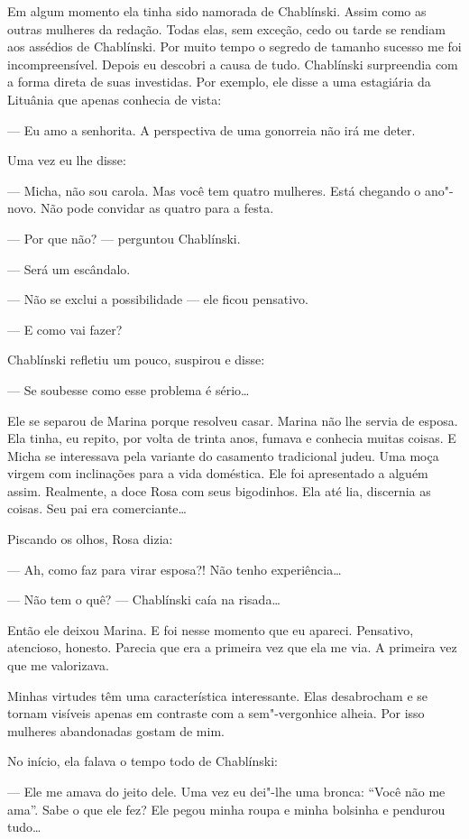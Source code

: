 Em algum momento ela tinha sido namorada de Chablínski. Assim como as
outras mulheres da redação. Todas elas, sem exceção, cedo ou tarde se
rendiam aos assédios de Chablínski. Por muito tempo o segredo de tamanho
sucesso me foi incompreensível. Depois eu descobri a causa de tudo.
Chablínski surpreendia com a forma direta de suas investidas. Por
exemplo, ele disse a uma estagiária da Lituânia que apenas conhecia de
vista:

--- Eu amo a senhorita. A perspectiva de uma gonorreia não irá me deter.

Uma vez eu lhe disse:

--- Micha, não sou carola. Mas você tem quatro mulheres. Está chegando o
ano"-novo. Não pode convidar as quatro para a festa.

--- Por que não? --- perguntou Chablínski.

--- Será um escândalo.

--- Não se exclui a possibilidade --- ele ficou pensativo.

--- E como vai fazer?

Chablínski refletiu um pouco, suspirou e disse:

--- Se soubesse como esse problema é sério\ldots{}

Ele se separou de Marina porque resolveu casar. Marina não lhe servia de
esposa. Ela tinha, eu repito, por volta de trinta anos, fumava e
conhecia muitas coisas. E Micha se interessava pela variante do
casamento tradicional judeu. Uma moça virgem com inclinações para a vida
doméstica. Ele foi apresentado a alguém assim. Realmente, a doce Rosa
com seus bigodinhos. Ela até lia, discernia as coisas. Seu pai era
comerciante\ldots{}

Piscando os olhos, Rosa dizia:

--- Ah, como faz para virar esposa?! Não tenho experiência\ldots{}

--- Não tem o quê? --- Chablínski caía na risada\ldots{}

Então ele deixou Marina. E foi nesse momento que eu apareci. Pensativo,
atencioso, honesto. Parecia que era a primeira vez que ela me via. A
primeira vez que me valorizava.

Minhas virtudes têm uma característica interessante. Elas desabrocham e
se tornam visíveis apenas em contraste com a sem"-vergonhice alheia. Por
isso mulheres abandonadas gostam de mim.

No início, ela falava o tempo todo de Chablínski:

--- Ele me amava do jeito dele. Uma vez eu dei"-lhe uma bronca: ``Você
não me ama''. Sabe o que ele fez? Ele pegou minha roupa e minha bolsinha
e pendurou tudo\ldots{}

